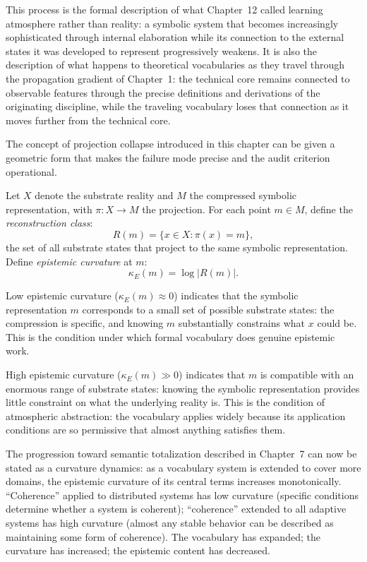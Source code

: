 \documentclass[12pt, openright, twoside]{book}
\begin{document}
This process is the formal description of what Chapter~12 called
learning atmosphere rather than reality: a symbolic system that becomes
increasingly sophisticated through internal elaboration while its
connection to the external states it was developed to represent
progressively weakens. It is also the description of what happens
to theoretical vocabularies as they travel through the propagation
gradient of Chapter~1: the technical core remains connected to
observable features through the precise definitions and derivations
of the originating discipline, while the traveling vocabulary loses
that connection as it moves further from the technical core.





\begin{technicalnote}[title={Technical Note: Epistemic Curvature and Reconstruction Uncertainty}]

The concept of projection collapse introduced in this chapter can be given a geometric
form that makes the failure mode precise and the audit criterion operational.

Let $X$ denote the substrate reality and $M$ the compressed symbolic representation,
with $\pi : X \to M$ the projection. For each point $m \in M$, define the
\emph{reconstruction class}:
\[
R(m) = \{x \in X : \pi(x) = m\},
\]
the set of all substrate states that project to the same symbolic representation.
Define \emph{epistemic curvature} at $m$:
\[
\kappa_E(m) = \log |R(m)|.
\]

Low epistemic curvature ($\kappa_E(m) \approx 0$) indicates that the symbolic
representation $m$ corresponds to a small set of possible substrate states: the
compression is specific, and knowing $m$ substantially constrains what $x$ could be.
This is the condition under which formal vocabulary does genuine epistemic work.

High epistemic curvature ($\kappa_E(m) \gg 0$) indicates that $m$ is compatible
with an enormous range of substrate states: knowing the symbolic representation
provides little constraint on what the underlying reality is. This is the condition
of atmospheric abstraction: the vocabulary applies widely because its application
conditions are so permissive that almost anything satisfies them.

The progression toward semantic totalization described in Chapter~7 can now be
stated as a curvature dynamics: as a vocabulary system is extended to cover more
domains, the epistemic curvature of its central terms increases monotonically.
``Coherence'' applied to distributed systems has low curvature (specific conditions
determine whether a system is coherent); ``coherence'' extended to all adaptive
systems has high curvature (almost any stable behavior can be described as
maintaining some form of coherence). The vocabulary has expanded; the curvature
has increased; the epistemic content has decreased.


\end{technicalnote}
\end{document}
